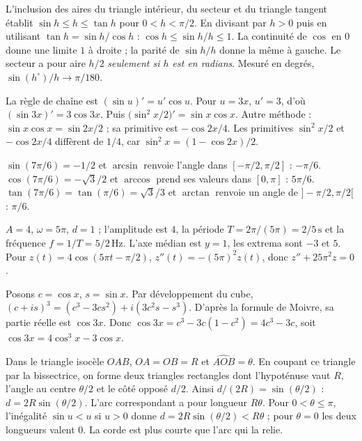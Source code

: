 L'inclusion des aires du triangle intérieur, du secteur et du triangle tangent établit $\sin h\le h\le\tan h$ pour $0<h<\pi/2$. En divisant par $h>0$ puis en utilisant $\tan h=\sin h/\cos h$ : $\cos h\le\sin h/h\le1$. La continuité de $\cos$ en $0$ donne une limite $1$ à droite ; la parité de $\sin h/h$ donne la même à gauche. Le secteur a pour aire $h/2$ \emph{seulement si $h$ est en radians}. Mesuré en degrés, $\sin(h^\circ)/h\to\pi/180$.

La règle de chaîne est $(\sin u)'=u'\cos u$. Pour $u=3x$, $u'=3$, d'où $(\sin3x)'=\boxed{3\cos3x}$. Puis $\bigl(\sin^2x/2\bigr)'=\sin x\cos x$. Autre méthode : $\sin x\cos x=\sin2x/2$ ; sa primitive est $-\cos2x/4$. Les primitives $\sin^2x/2$ et $-\cos2x/4$ diffèrent de $1/4$, car $\sin^2x=(1-\cos2x)/2$.

$\sin(7\pi/6)=-1/2$ et $\arcsin$ renvoie l'angle dans $[-\pi/2,\pi/2]$ : $\boxed{-\pi/6}$. $\cos(7\pi/6)=-\sqrt3/2$ et $\arccos$ prend ses valeurs dans $[0,\pi]$ : $\boxed{5\pi/6}$. $\tan(7\pi/6)=\tan(\pi/6)=\sqrt3/3$ et $\arctan$ renvoie un angle de $]-\pi/2,\pi/2[$ : $\boxed{\pi/6}$.

$A=4$, $\omega=5\pi$, $d=1$ ; l'amplitude est $\boxed{4}$, la période $T=2\pi/(5\pi)=\boxed{2/5\,\mathrm s}$ et la fréquence $f=1/T=\boxed{5/2\,\mathrm{Hz}}$. L'axe médian est $y=1$, les extrema sont $\boxed{-3\text{ et }5}$. Pour $z(t)=4\cos(5\pi t-\pi/2)$, $z''(t)=-(5\pi)^2z(t)$, donc $\boxed{z''+25\pi^2z=0}$.

Posons $c=\cos x$, $s=\sin x$. Par développement du cube, $(c+is)^3=(c^3-3cs^2)+i(3c^2s-s^3)$. D'après la formule de Moivre, sa partie réelle est $\cos3x$. Donc $\cos3x=c^3-3c(1-c^2)=4c^3-3c$, soit $\boxed{\cos3x=4\cos^3x-3\cos x}$.

Dans le triangle isocèle $OAB$, $OA=OB=R$ et $\widehat{AOB}=\theta$. En coupant ce triangle par la bissectrice, on forme deux triangles rectangles dont l'hypoténuse vaut $R$, l'angle au centre $\theta/2$ et le côté opposé $d/2$. Ainsi $d/(2R)=\sin(\theta/2)$ : $\boxed{d=2R\sin(\theta/2)}$. L'arc correspondant a pour longueur $R\theta$. Pour $0<\theta\le\pi$, l'inégalité $\sin u<u$ si $u>0$ donne $d=2R\sin(\theta/2)<R\theta$ ; pour $\theta=0$ les deux longueurs valent $0$. La corde est plus courte que l'arc qui la relie.
